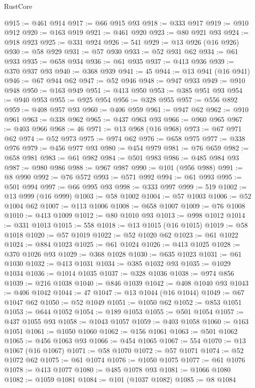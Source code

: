 \begin{lexlean}{RustCore}
\begin{coremodule}
@915 := @461 @914
@917 := @66 @915 @93
@918 := @333 @917
@919 := @910 @912
@920 := @163 @919
@921 := @461 @920
@923 := @80 @921 @93
@924 := @918 @923
@925 := @331 @924
@926 := 541
@929 := @13 @926 (@16 @926)
@930 := @58 @929
@931 := @57 @930
@933 := @52 @931 @62
@934 := @61 @933
@935 := @658 @934
@936 := @61 @935
@937 := @413 @936
@939 := @370 @937 @93
@940 := @368 @939
@941 := 45
@944 := @13 @941 (@16 @941)
@946 := @67 @944 @62
@947 := @52 @946
@948 := @947 @933
@949 := @910 @948
@950 := @163 @949
@951 := @413 @950
@953 := @385 @951 @93
@954 := @940 @953
@955 := @925 @954
@956 := @328 @955
@957 := @556 @892
@959 := @408 @957 @93
@960 := @406 @959
@961 := @947 @62
@962 := @910 @961
@963 := @338 @962
@965 := @437 @963 @93
@966 := @960 @965
@967 := @403 @966
@968 := 46
@971 := @13 @968 (@16 @968)
@973 := @67 @971 @62
@974 := @52 @973
@975 := @974 @62
@976 := @658 @975
@977 := @338 @976
@979 := @456 @977 @93
@980 := @454 @979
@981 := @76 @659
@982 := @658 @981
@983 := @61 @982
@984 := @501 @983
@986 := @485 @984 @93
@987 := @980 @986
@988 := @967 @987
@990 := @101 (@956 @988)
@991 := @8 @990
@992 := @76 @572
@993 := @571 @992
@994 := @61 @993
@995 := @501 @994
@997 := @66 @995 @93
@998 := @333 @997
@999 := 519
@1002 := @13 @999 (@16 @999)
@1003 := @58 @1002
@1004 := @57 @1003
@1006 := @52 @1004 @62
@1007 := @113 @1006
@1008 := @658 @1007
@1009 := @76 @1008
@1010 := @413 @1009
@1012 := @80 @1010 @93
@1013 := @998 @1012
@1014 := @331 @1013
@1015 := 558
@1018 := @13 @1015 (@16 @1015)
@1019 := @58 @1018
@1020 := @57 @1019
@1022 := @52 @1020 @62
@1023 := @61 @1022
@1024 := @884 @1023
@1025 := @61 @1024
@1026 := @413 @1025
@1028 := @370 @1026 @93
@1029 := @368 @1028
@1030 := @635 @1023
@1031 := @61 @1030
@1032 := @413 @1031
@1034 := @385 @1032 @93
@1035 := @1029 @1034
@1036 := @1014 @1035
@1037 := @328 @1036
@1038 := @974 @856
@1039 := @216 @1038
@1040 := @846 @1039
@1042 := @408 @1040 @93
@1043 := @406 @1042
@1044 := 47
@1047 := @13 @1044 (@16 @1044)
@1049 := @67 @1047 @62
@1050 := @52 @1049
@1051 := @1050 @62
@1052 := @853 @1051
@1053 := @644 @1052
@1054 := @189 @1053
@1055 := @501 @1054
@1057 := @437 @1055 @93
@1058 := @1043 @1057
@1059 := @403 @1058
@1060 := @163 @1051
@1061 := @1050 @1060
@1062 := @156 @1061
@1063 := @501 @1062
@1065 := @456 @1063 @93
@1066 := @454 @1065
@1067 := 554
@1070 := @13 @1067 (@16 @1067)
@1071 := @58 @1070
@1072 := @57 @1071
@1074 := @52 @1072 @62
@1075 := @61 @1074
@1076 := @1050 @1075
@1077 := @61 @1076
@1078 := @413 @1077
@1080 := @485 @1078 @93
@1081 := @1066 @1080
@1082 := @1059 @1081
@1084 := @101 (@1037 @1082)
@1085 := @8 @1084

\end{coremodule}
\end{lexlean}
